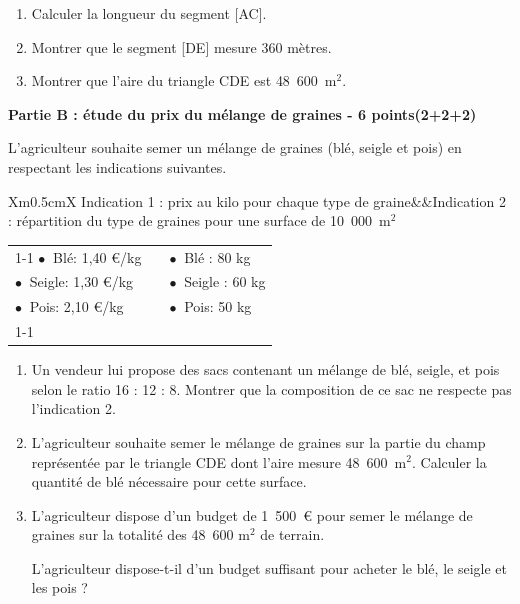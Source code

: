 \documentclass[14 pt, fleqn,pstricks]{extarticle}
\theoremstyle{plain}
\begin{document}
\medskip

\begin{enumerate}
\item Calculer la longueur du segment [AC].
\item  Montrer que le segment [DE] mesure $360$ mètres.
\item Montrer que l'aire du triangle CDE est {48~600}~m$^2$.
\end{enumerate}

\newpage

\textbf{Partie B : étude du prix du mélange de graines - 6 points(2+2+2)}

\medskip

L'agriculteur souhaite semer un mélange de graines (blé, seigle et pois) en respectant les indications suivantes.

\medskip

\begin{tabularx}{\linewidth}{Xm{0.5cm}X}
Indication 1 : prix au kilo pour chaque type de graine&&Indication 2 : répartition du type de graines pour une surface de {10~000}~m$^2$\\
\end{tabularx}
\begin{tabularx}{\linewidth}{|X|m{0.5cm}|X|}\cline{1-1}\cline{3-3}
$\bullet~$ Blé: 1,40 \euro/kg		&	&$\bullet~$ Blé : 80 kg\\ 
$\bullet~$ Seigle: 1,30 \euro/kg	&	&$\bullet~$ Seigle : 60 kg\\
$\bullet~$ Pois: 2,10 \euro/kg		&	&$\bullet~$ Pois: 50 kg\\ \cline{1-1}\cline{3-3}
\end{tabularx}

\medskip

\begin{enumerate}
\item Un vendeur lui propose des sacs contenant un mélange de blé, seigle, et pois selon le ratio 16 : 12 : 8. Montrer que la composition de ce sac ne respecte pas l'indication 2.
\item L'agriculteur souhaite semer le mélange de graines sur la partie du champ représentée par le triangle CDE dont l'aire mesure {48~600}~m$^2$. Calculer la quantité de blé nécessaire pour cette surface.
 
\item L'agriculteur dispose d'un budget de 1~500~\euro{} pour semer le mélange de graines sur la totalité des 48~600 m$^2$ de terrain. 

L'agriculteur dispose-t-il d'un budget suffisant pour acheter le blé, le seigle et les pois ?
\end{enumerate}
  
 	
\end{document}

